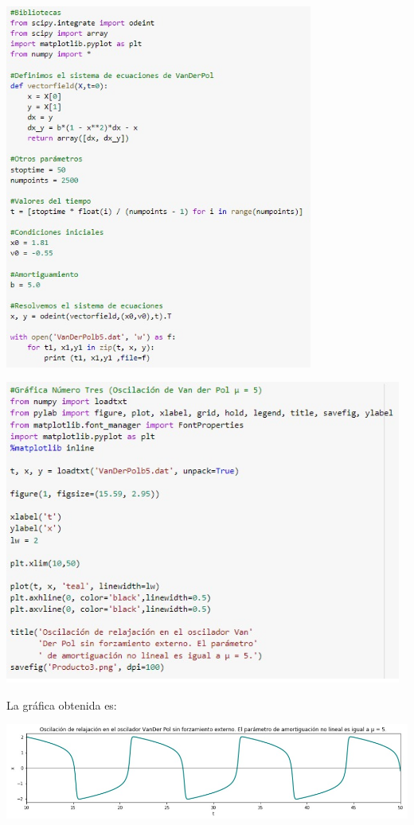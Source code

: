 \documentclass[12pt]{article}
\begin{document}
\begin{center}
    \includegraphics[height=12cm]{O5.jpeg}\\
\end{center}
\begin{center}
    \includegraphics[height=10cm]{O6.jpeg}\\
\end{center}
La gráfica obtenida es:
\begin{center}
    \includegraphics[height=3.15cm]{4.jpeg}\\
\end{center}
\end{document}

